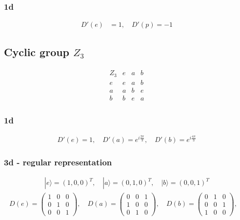 \documentclass[10pt,a4paper]{article}
\theoremstyle{definition}
\begin{document}
\subsubsection{1d}
\begin{align}
D'(e)&=1,\quad D'(p)=-1
\end{align}

\subsection{Cyclic group \texorpdfstring{$Z_3$}{TEXT}}
\begin{align}
\begin{array}{c||ccc}
Z_3 & e & a & b \\ \hline\hline
e & e & a & b \\
a & a & b & e \\
b & b & e & a
\end{array}
\end{align}
\subsubsection{1d}
\begin{align}
D'(e)=1,\quad D'(a)=e^{i\frac{2\pi}{3}},\quad D'(b)=e^{i\frac{4\pi}{3}}
\end{align}


\subsubsection{3d - regular representation}
\begin{align}
|e\rangle=(1,0,0)^T,\quad |a\rangle=(0,1,0)^T,\quad |b\rangle=(0,0,1)^T
\end{align}
\begin{align}
D(e)=\left(\begin{array}{ccc}
1 & 0 & 0 \\
0 & 1 & 0 \\
0 & 0 & 1 
\end{array}
\right),\quad
D(a)=\left(\begin{array}{ccc}
0 & 0 & 1 \\
1 & 0 & 0 \\
0 & 1 & 0 
\end{array}
\right),\quad
D(b)=\left(\begin{array}{ccc}
0 & 1 & 0 \\
0 & 0 & 1 \\
1 & 0 & 0 
\end{array}
\right),\quad
\end{align}
\end{document}
